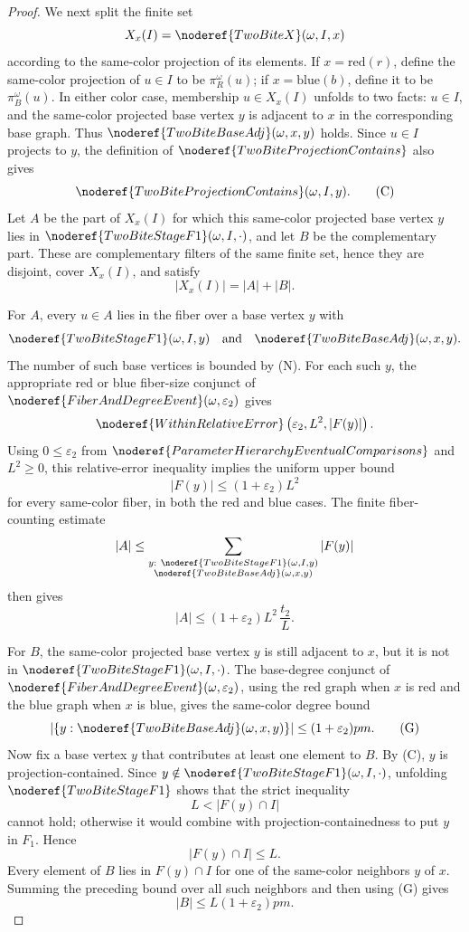 \begin{proof}
We next split the finite set
\[
X_x(I)=\noderef{TwoBiteX}(\omega,I,x)
\]
according to the same-color projection of its elements.  If \(x=\mathrm{red}
(r)\), define the same-color projection of \(u\in I\) to be
\(\pi_R^\omega(u)\); if \(x=\mathrm{blue}(b)\), define it to be
\(\pi_B^\omega(u)\).  In either color case, membership
\(u\in X_x(I)\) unfolds to two facts: \(u\in I\), and the same-color projected
base vertex \(y\) is adjacent to \(x\) in the corresponding base graph.  Thus
\(\noderef{TwoBiteBaseAdj}(\omega,x,y)\) holds.  Since \(u\in I\) projects to
\(y\), the definition of \(\noderef{TwoBiteProjectionContains}\) also gives
\[
\noderef{TwoBiteProjectionContains}(\omega,I,y). \tag{C}
\]
Let \(A\) be the part of \(X_x(I)\) for which this same-color projected base
vertex \(y\) lies in \(\noderef{TwoBiteStageF1}(\omega,I,\cdot)\), and let
\(B\) be the complementary part.  These are complementary filters of the same
finite set, hence they are disjoint, cover \(X_x(I)\), and satisfy
\[
|X_x(I)|=|A|+|B|. \tag{D}
\]

For \(A\), every \(u\in A\) lies in the fiber over a base vertex \(y\) with
\[
\noderef{TwoBiteStageF1}(\omega,I,y)
\quad\text{and}\quad
\noderef{TwoBiteBaseAdj}(\omega,x,y).
\]
The number of such base vertices is bounded by (N).  For each such \(y\), the
appropriate red or blue fiber-size conjunct of
\(\noderef{FiberAndDegreeEvent}(\omega,\varepsilon_2)\) gives
\[
\noderef{WithinRelativeError}
  \left(\varepsilon_2,L^2,|F(y)|\right).
\]
Using \(0\le\varepsilon_2\) from
\(\noderef{ParameterHierarchyEventualComparisons}\) and \(L^2\ge0\), this
relative-error inequality implies the uniform upper bound
\[
|F(y)|\le (1+\varepsilon_2)L^2
\]
for every same-color fiber, in both the red and blue cases.  The finite
fiber-counting estimate
\[
|A|\le
\sum_{\substack{y:\ \noderef{TwoBiteStageF1}(\omega,I,y)\\
        \noderef{TwoBiteBaseAdj}(\omega,x,y)}} |F(y)|
\]
then gives
\[
|A|\le (1+\varepsilon_2)L^2\,\frac{t_2}{L}. \tag{A}
\]

For \(B\), the same-color projected base vertex \(y\) is still adjacent to
\(x\), but it is not in \(\noderef{TwoBiteStageF1}(\omega,I,\cdot)\).  The
base-degree conjunct of
\(\noderef{FiberAndDegreeEvent}(\omega,\varepsilon_2)\), using the red graph
when \(x\) is red and the blue graph when \(x\) is blue, gives the same-color
degree bound
\[
|\{y:\noderef{TwoBiteBaseAdj}(\omega,x,y)\}|\le (1+\varepsilon_2)pm.
\tag{G}
\]
Now fix a base vertex \(y\) that contributes at least one element to \(B\).
By (C), \(y\) is projection-contained.  Since \(y\notin
\noderef{TwoBiteStageF1}(\omega,I,\cdot)\), unfolding
\(\noderef{TwoBiteStageF1}\) shows that the strict inequality
\[
L<|F(y)\cap I|
\]
cannot hold; otherwise it would combine with projection-containedness to put
\(y\) in \(F_1\).  Hence
\[
|F(y)\cap I|\le L.
\]
Every element of \(B\) lies in \(F(y)\cap I\) for one of the same-color
neighbors \(y\) of \(x\).  Summing the preceding bound over all such neighbors
and then using (G) gives
\[
|B|\le L(1+\varepsilon_2)pm. \tag{B}
\]


\end{proof}
